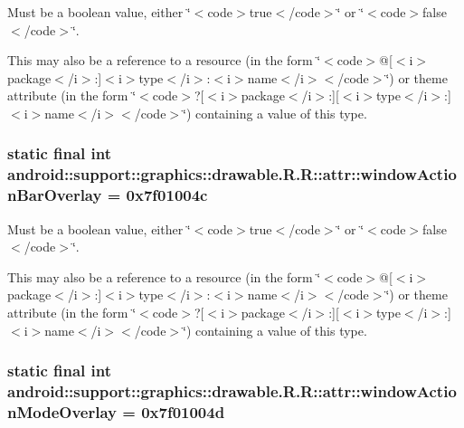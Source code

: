 Must be a boolean value, either \char`\"{}$<$code$>$true$<$/code$>$\char`\"{} or \char`\"{}$<$code$>$false$<$/code$>$\char`\"{}. 

This may also be a reference to a resource (in the form \char`\"{}$<$code$>$@\mbox{[}$<$i$>$package$<$/i$>$:\mbox{]}$<$i$>$type$<$/i$>$:$<$i$>$name$<$/i$>$$<$/code$>$\char`\"{}) or theme attribute (in the form \char`\"{}$<$code$>$?\mbox{[}$<$i$>$package$<$/i$>$:\mbox{]}\mbox{[}$<$i$>$type$<$/i$>$:\mbox{]}$<$i$>$name$<$/i$>$$<$/code$>$\char`\"{}) containing a value of this type. \hypertarget{classandroid_1_1support_1_1graphics_1_1drawable_1_1_r_1_1attr_0e37bfe4a2356be9deb3703b4577501c}{
\subsubsection[{windowActionBarOverlay}]{\setlength{\rightskip}{0pt plus 5cm}static final int android::support::graphics::drawable.R.R::attr::windowActionBarOverlay = 0x7f01004c}}
\label{classandroid_1_1support_1_1graphics_1_1drawable_1_1_r_1_1attr_0e37bfe4a2356be9deb3703b4577501c}


Must be a boolean value, either \char`\"{}$<$code$>$true$<$/code$>$\char`\"{} or \char`\"{}$<$code$>$false$<$/code$>$\char`\"{}. 

This may also be a reference to a resource (in the form \char`\"{}$<$code$>$@\mbox{[}$<$i$>$package$<$/i$>$:\mbox{]}$<$i$>$type$<$/i$>$:$<$i$>$name$<$/i$>$$<$/code$>$\char`\"{}) or theme attribute (in the form \char`\"{}$<$code$>$?\mbox{[}$<$i$>$package$<$/i$>$:\mbox{]}\mbox{[}$<$i$>$type$<$/i$>$:\mbox{]}$<$i$>$name$<$/i$>$$<$/code$>$\char`\"{}) containing a value of this type. \hypertarget{classandroid_1_1support_1_1graphics_1_1drawable_1_1_r_1_1attr_191455c098f934dc4013ce3dfc2c6abf}{
\subsubsection[{windowActionModeOverlay}]{\setlength{\rightskip}{0pt plus 5cm}static final int android::support::graphics::drawable.R.R::attr::windowActionModeOverlay = 0x7f01004d}}
\label{classandroid_1_1support_1_1graphics_1_1drawable_1_1_r_1_1attr_191455c098f934dc4013ce3dfc2c6abf}



